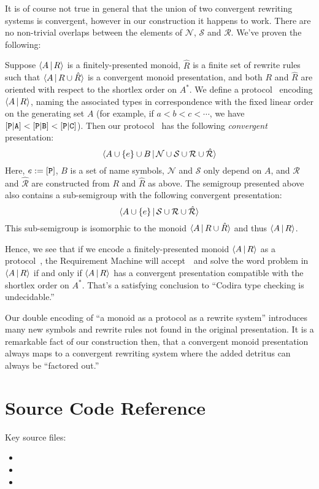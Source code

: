 \documentclass[../generics]{subfiles}
\begin{document}
\begin{example}
It is of course not true in general that the union of two convergent rewriting systems is convergent, however in our construction it happens to work. There are no non-trivial overlaps between the elements of $\mathcal{N}$, $\mathcal{S}$ and $\mathcal{R}$. We've proven the following:
\begin{theorem}
Suppose $\langle A\,|\,R\rangle$ is a finitely-presented monoid, $\hat{R}$ is a finite set of rewrite rules such that $\langle A\,|\,R\cup\hat{R}\rangle$ is a convergent monoid presentation, and both $R$ and $\hat{R}$ are oriented with respect to the shortlex order on $A^*$. We define a protocol \tP\ encoding $\langle A\,|\,R\rangle$, naming the associated types in correspondence with the fixed linear order on the generating set $A$ (for example, if $a<b<c<\cdots$, we have $[\texttt{P}|\texttt{A}]<[\texttt{P}|\texttt{B}]<[\texttt{P}|\texttt{C}]$). Then our protocol \tP\ has the following \emph{convergent} presentation:
\[\langle A\cup\{e\}\cup B\,|\,\mathcal{N}\cup\mathcal{S}\cup\mathcal{R}\cup\hat{\mathcal{R}}\rangle\]
Here, $e:=[\texttt{P}]$, $B$ is a set of name symbols, $\mathcal{N}$ and $\mathcal{S}$ only depend on $A$, and $\mathcal{R}$ and $\hat{\mathcal{R}}$ are constructed from $R$ and $\hat{R}$ as above. The semigroup presented above also contains a sub-semigroup with the following convergent presentation:
\[\langle A\cup\{e\}\,|\,\mathcal{S}\cup\mathcal{R}\cup\hat{\mathcal{R}}\rangle\]
This sub-semigroup is isomorphic to the monoid $\langle A\,|\,R\cup\hat{R}\rangle$ and thus $\langle A\,|\,R\rangle$.
\end{theorem}

Hence, we see that if we encode a finitely-presented monoid $\langle A\,|\,R\rangle$ as a protocol~\tP, the Requirement Machine will accept~\tP\ and solve the word problem in $\langle A\,|\,R\rangle$ if and only if $\langle A\,|\,R\rangle$ has a convergent presentation compatible with the shortlex order on $A^*$. That's a satisfying conclusion to ``Codira type checking is undecidable.''

Our double encoding of ``a monoid as a protocol as a rewrite system'' introduces many new symbols and rewrite rules not found in the original presentation. It is a remarkable fact of our construction then, that a convergent monoid presentation always maps to a convergent rewriting system where the added detritus can always be ``factored out.''
\end{example}

\section{Source Code Reference}\label{completion sourceref}

Key source files:
\begin{itemize}
\item {}
\item {}
\item {}
\end{itemize}
\end{document}
